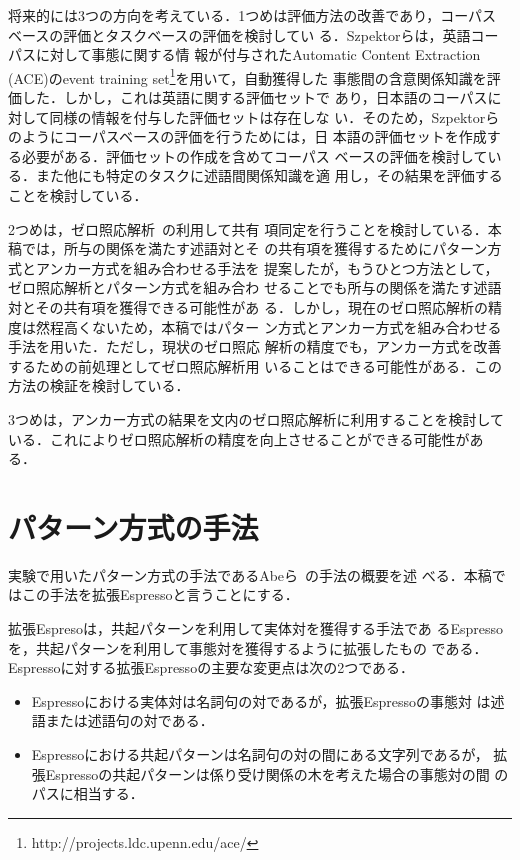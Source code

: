 \documentclass[japanese]{jnlp_1.4}
\begin{document}
将来的には3つの方向を考えている．1つめは評価方法の改善であり，コーパス
ベースの評価とタスクベースの評価を検討してい
る．Szpektorら\cite{Szpektor2008}は，英語コーパスに対して事態に関する情
報が付与されたAutomatic Content Extraction (ACE)のevent training
set\footnote{http://projects.ldc.upenn.edu/ace/}を用いて，自動獲得した
事態間の含意関係知識を評価した．しかし，これは英語に関する評価セットで
あり，日本語のコーパスに対して同様の情報を付与した評価セットは存在しな
い．そのため，Szpektorらのようにコーパスベースの評価を行うためには，日
本語の評価セットを作成する必要がある．評価セットの作成を含めてコーパス
ベースの評価を検討している．また他にも特定のタスクに述語間関係知識を適
用し，その結果を評価することを検討している．

2つめは，ゼロ照応解析~\cite[etc.]{iida:ACL06,komachi2007}の利用して共有
項同定を行うことを検討している．本稿では，所与の関係を満たす述語対とそ
の共有項を獲得するためにパターン方式とアンカー方式を組み合わせる手法を
提案したが，もうひとつ方法として，ゼロ照応解析とパターン方式を組み合わ
せることでも所与の関係を満たす述語対とその共有項を獲得できる可能性があ
る．しかし，現在のゼロ照応解析の精度は然程高くないため，本稿ではパター
ン方式とアンカー方式を組み合わせる手法を用いた．ただし，現状のゼロ照応
解析の精度でも，アンカー方式を改善するための前処理としてゼロ照応解析用
いることはできる可能性がある．この方法の検証を検討している．

3つめは，アンカー方式の結果を文内のゼロ照応解析に利用することを検討して
いる．これによりゼロ照応解析の精度を向上させることができる可能性があ
る．



\appendix
\section{パターン方式の手法}
\label{sec:patt_method}

実験で用いたパターン方式の手法であるAbeら~\cite{abe:08}の手法の概要を述
べる．本稿ではこの手法を拡張Espressoと言うことにする．

拡張Espresoは，共起パターンを利用して実体対を獲得する手法であ
るEspressoを，共起パターンを利用して事態対を獲得するように拡張したもの
である．Espressoに対する拡張Espressoの主要な変更点は次の2つである．
\begin{itemize}
\item Espressoにおける実体対は名詞句の対であるが，拡張Espressoの事態対
  は述語または述語句の対である．
\item Espressoにおける共起パターンは名詞句の対の間にある文字列であるが，
  拡張Espressoの共起パターンは係り受け関係の木を考えた場合の事態対の間
  のパスに相当する．
\end{itemize}
\end{document}
